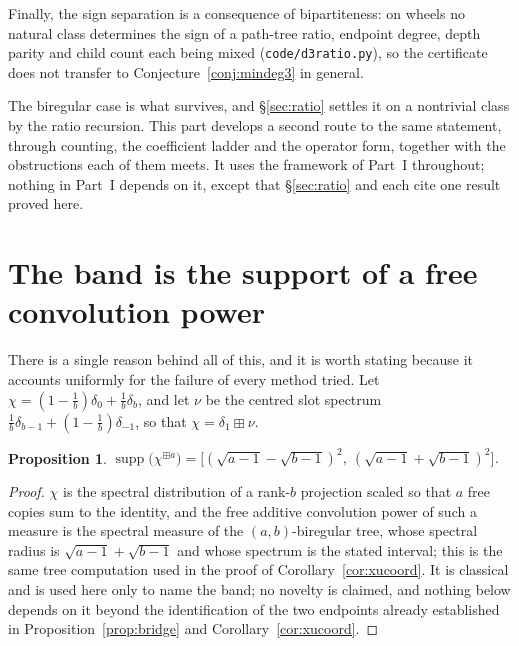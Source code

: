 \documentclass[11pt]{article}
\newtheorem{proposition}[theorem]{Proposition}
\theoremstyle{remark}
\begin{document}
Finally, the sign separation is a consequence of bipartiteness: on wheels no natural class
determines the sign of a path-tree ratio, endpoint degree, depth parity and child count each
being mixed (\texttt{code/d3ratio.py}), so the certificate does not transfer to
Conjecture~\ref{conj:mindeg3} in general.


The biregular case is what survives, and \S\ref{sec:ratio} settles it on a nontrivial class by
the ratio recursion. This part develops a second route to the same statement, through counting,
the coefficient ladder and the operator form, together with the obstructions each of them meets.
It uses the framework of Part~I throughout; nothing in Part~I depends on it, except that
\S\ref{sec:ratio} and \cite{PartI} each cite one result proved here.

\section{The band is the support of a free convolution power}

There is a single reason behind all of this, and it is worth stating because it
accounts uniformly for the failure of every method tried. Let
$\chi=(1-\tfrac1b)\delta_0+\tfrac1b\delta_b$, and let $\nu$ be the centred slot
spectrum $\tfrac1b\delta_{b-1}+(1-\tfrac1b)\delta_{-1}$, so that
$\chi=\delta_1\boxplus\nu$.

\begin{proposition}\label{prop:freepower}
$\operatorname{supp}\bigl(\chi^{\boxplus a}\bigr)
=\bigl[(\sqrt{a-1}-\sqrt{b-1})^2,\ (\sqrt{a-1}+\sqrt{b-1})^2\bigr]$.
\end{proposition}

\begin{proof}
$\chi$ is the spectral distribution of a rank-$b$ projection scaled so that $a$ free copies sum to
the identity, and the free additive convolution power of such a measure is the spectral measure of
the $(a,b)$-biregular tree, whose spectral radius is $\sqrt{a-1}+\sqrt{b-1}$ and whose spectrum is
the stated interval; this is the same tree computation used in the proof of
Corollary~\ref{cor:xucoord}. It is classical and is used here only to name the band; no novelty is
claimed,
and nothing below depends on it beyond the identification of the two endpoints already established
in Proposition~\ref{prop:bridge} and Corollary~\ref{cor:xucoord}.
\end{proof}
\end{document}
